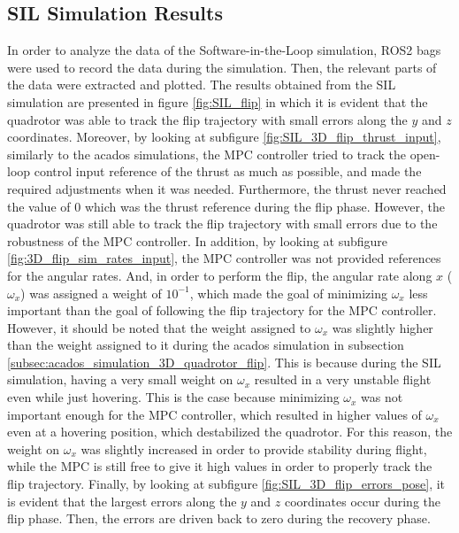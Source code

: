 \documentclass{thesisreport}
\begin{document}
\subsection{SIL Simulation Results}

In order to analyze the data of the Software-in-the-Loop simulation, ROS2 bags were used to record the data during the simulation. Then, the relevant parts of the data were extracted and plotted. The results obtained from the SIL simulation are presented in figure \ref{fig:SIL_flip} in which it is evident that the quadrotor was able to track the flip trajectory with small errors along the $y$ and $z$ coordinates. Moreover, by looking at subfigure \ref{fig:SIL_3D_flip_thrust_input}, similarly to the acados simulations, the MPC controller tried to track the open-loop control input reference of the thrust as much as possible, and made the required adjustments when it was needed. Furthermore, the thrust never reached the value of 0 which was the thrust reference during the flip phase. However, the quadrotor was still able to track the flip trajectory with small errors due to the robustness of the MPC controller. In addition, by looking at subfigure \ref{fig:3D_flip_sim_rates_input}, the MPC controller was not provided references for the angular rates. And, in order to perform the flip, the angular rate along $x$ ($\omega_x$) was assigned a weight of $10^{-1}$, which made the goal of minimizing $\omega_x$ less important than the goal of following the flip trajectory for the MPC controller. However, it should be noted that the weight assigned to $\omega_x$ was slightly higher than the weight assigned to it during the acados simulation in subsection \ref{subsec:acados_simulation_3D_quadrotor_flip}. This is because during the SIL simulation, having a very small weight on $\omega_x$ resulted in a very unstable flight even while just hovering. This is the case because minimizing $\omega_x$ was not important enough for the MPC controller, which resulted in higher values of $\omega_x$ even at a hovering position, which destabilized the quadrotor. For this reason, the weight on $\omega_x$ was slightly increased in order to provide stability during flight, while the MPC is still free to give it high values in order to properly track the flip trajectory. Finally, by looking at subfigure \ref{fig:SIL_3D_flip_errors_pose}, it is evident that the largest errors along the $y$ and $z$ coordinates occur during the flip phase. Then, the errors are driven back to zero during the recovery phase.
\end{document}
